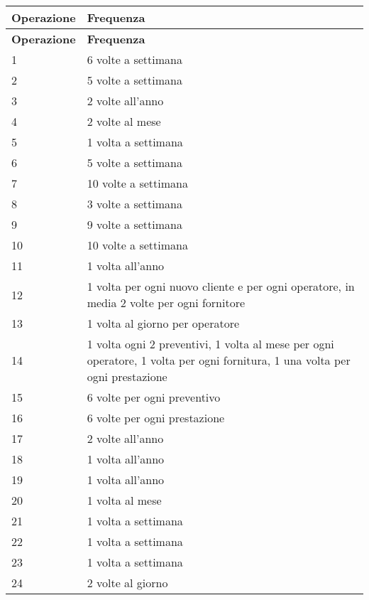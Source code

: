 			\begin{longtable}{| p{6cm} | p{6cm} |}
				
				\hline
				\textbf{Operazione} & 
				\textbf{Frequenza} \\
				\hline
				
				\endfirsthead
				
				\hline
				\textbf{Operazione} & 
				\textbf{Frequenza} \\
				\hline
				
				\endhead
				
				1 & 6 volte a settimana \\ \hline
				2 & 5 volte a settimana \\ \hline
				3 & 2 volte all'anno\\ \hline
				4 & 2 volte al mese \\ \hline
				5 & 1 volta a settimana \\ \hline
				6 & 5 volte a settimana \\ \hline
				7 & 10 volte a settimana\\ \hline
				8 & 3 volte a settimana \\ \hline
				9 & 9 volte a settimana \\ \hline
				10 & 10 volte a settimana\\ \hline
				11 & 1 volta all'anno\\ \hline
				12 & 1 volta per ogni nuovo cliente e per ogni operatore, in media 2 volte per ogni fornitore\\ \hline
				13 & 1 volta al giorno per operatore \\ \hline
				14 & 1 volta ogni 2 preventivi, 1 volta al mese per ogni operatore, 1 volta per ogni fornitura, 1 una volta per ogni prestazione \\ \hline
				15 & 6 volte per ogni preventivo \\ \hline
				16 & 6 volte per ogni prestazione\\ \hline
				17 & 2 volte all'anno\\ \hline
				18 & 1 volta all'anno\\ \hline
				19 & 1 volta all'anno\\ \hline
				20 & 1 volta al mese \\ \hline
				21 & 1 volta a settimana \\ \hline
				22 & 1 volta a settimana \\ \hline
				23 & 1 volta a settimana \\ \hline
				24 & 2 volte al giorno \\ \hline

\end{longtable}
